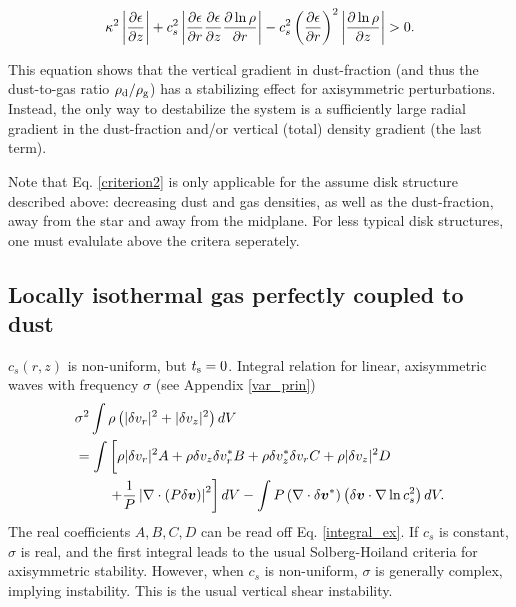 \begin{align} 
  \kappa^2\left|\frac{\partial\epsilon}{\partial z}\right| + c_s^2\left|\frac{\partial
    \epsilon}{\partial r}\frac{\partial\epsilon}{\partial z}\frac{\partial\ln{\rho}}{\partial
    r}\right| - c_s^2 \left(\frac{\partial\epsilon}{\partial
    r}\right)^2\left|\frac{\partial\ln{\rho}}{\partial z}\right| > 0.  \label{criterion2}
\end{align}

This equation shows that the vertical gradient in dust-fraction (and
thus the dust-to-gas ratio $\rho_\mathrm{d}/\rho_\mathrm{g}$) has a stabilizing effect for
axisymmetric perturbations. Instead, the only way to destabilize the
system is a sufficiently large radial gradient in the dust-fraction
and/or vertical (total) density gradient (the last term).  

Note that Eq. \ref{criterion2} is only applicable for the assume disk
structure described above: decreasing dust and gas densities, as well
as the dust-fraction, away from the star and away from the
midplane. For less typical disk structures, one must evalulate above the
critera seperately. 

\subsection{Locally isothermal gas perfectly coupled to dust} 
$c_s(r,z)$ is non-uniform, but $t_\mathrm{s}=0$. Integral relation for
linear, axisymmetric waves with frequency $\sigma$ (see Appendix \ref{var_prin})
\begin{align}
&  \sigma^2\int\rho\left(|\dd v_r|^2 + |\dd v_z|^2\right)dV \notag\\
&= \int\left[ \rho
  |\dd v_r|^2A + \rho  \dd v_z \dd v_r^* B + \rho \dd v_z^*\dd v_r C +
  \rho |\dd v_z|^2 D\phantom{\frac{1}{1}}\right. \notag\\
&\phantom{===}  \left. + \frac{1}{P}\left|\nabla\cdot\left(P\dd
  \bm{v}\right)\right|^2\right]dV - \int P
  \left(\nabla\cdot\dd\bm{v}^*\right)\left(\dd\bm{v}\cdot\nabla\ln{c_s^2}\right)dV.
\end{align}
The real coefficients $A,B,C,D$ can be read off
Eq. \ref{integral_ex}. If $c_s$ is constant, $\sigma$ is real, and 
the first integral leads to the usual Solberg-Hoiland criteria for
axisymmetric stability. However, when $c_s$ is non-uniform, $\sigma$
is generally complex, implying instability. This is the usual vertical
shear instability. 
